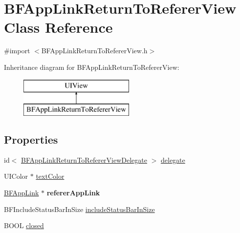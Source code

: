 \hypertarget{interface_b_f_app_link_return_to_referer_view}{}\section{B\+F\+App\+Link\+Return\+To\+Referer\+View Class Reference}
\label{interface_b_f_app_link_return_to_referer_view}


{\ttfamily \#import $<$B\+F\+App\+Link\+Return\+To\+Referer\+View.\+h$>$}

Inheritance diagram for B\+F\+App\+Link\+Return\+To\+Referer\+View\+:\begin{figure}[H]
\begin{center}
\leavevmode
\includegraphics[height=2.000000cm]{interface_b_f_app_link_return_to_referer_view}
\end{center}
\end{figure}
\subsection*{Properties}
\begin{DoxyCompactItemize}
\item 
id$<$ \hyperlink{protocol_b_f_app_link_return_to_referer_view_delegate-p}{B\+F\+App\+Link\+Return\+To\+Referer\+View\+Delegate} $>$ \hyperlink{interface_b_f_app_link_return_to_referer_view_aca2022c4be7763b7450d2a39df24b95a}{delegate}
\item 
U\+I\+Color $\ast$ \hyperlink{interface_b_f_app_link_return_to_referer_view_acef579105c567f8f22a2604ea388a37b}{text\+Color}
\item 
\hypertarget{interface_b_f_app_link_return_to_referer_view_ab4a55f394888bd423c01532a9c6dafef}{}\hyperlink{interface_b_f_app_link}{B\+F\+App\+Link} $\ast$ {\bfseries referer\+App\+Link}\label{interface_b_f_app_link_return_to_referer_view_ab4a55f394888bd423c01532a9c6dafef}

\item 
B\+F\+Include\+Status\+Bar\+In\+Size \hyperlink{interface_b_f_app_link_return_to_referer_view_a640b53f5c49f1bfb5f11a81a8f7381af}{include\+Status\+Bar\+In\+Size}
\item 
B\+O\+O\+L \hyperlink{interface_b_f_app_link_return_to_referer_view_acb041d67e8a2f626ae99a788aa8d1da4}{closed}
\end{DoxyCompactItemize}


